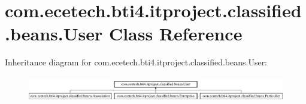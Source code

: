 \hypertarget{classcom_1_1ecetech_1_1bti4_1_1itproject_1_1classified_1_1beans_1_1_user}{}\section{com.\+ecetech.\+bti4.\+itproject.\+classified.\+beans.\+User Class Reference}
\label{classcom_1_1ecetech_1_1bti4_1_1itproject_1_1classified_1_1beans_1_1_user}
Inheritance diagram for com.\+ecetech.\+bti4.\+itproject.\+classified.\+beans.\+User\+:\begin{figure}[H]
\begin{center}
\leavevmode
\includegraphics[height=1.134752cm]{classcom_1_1ecetech_1_1bti4_1_1itproject_1_1classified_1_1beans_1_1_user}
\end{center}
\end{figure}
